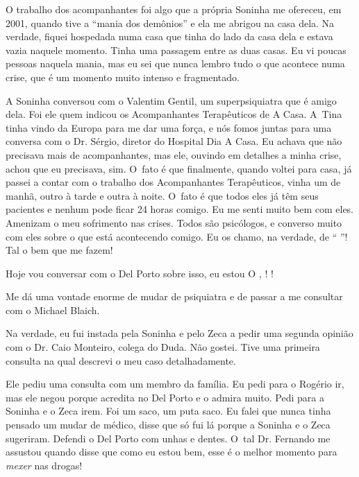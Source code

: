 O trabalho dos acompanhantes foi algo que a própria Soninha me
ofereceu, em 2001, quando tive a ``mania dos demônios'' e ela me abrigou
na casa dela. Na verdade, fiquei hospedada numa casa que tinha do lado
da casa dela e estava vazia naquele momento. Tinha uma passagem entre as
duas casas. Eu vi poucas pessoas naquela mania, mas eu sei que nunca
lembro tudo o que acontece numa crise, que é um momento muito intenso e
fragmentado.

A Soninha conversou com o Valentim Gentil, um superpsiquiatra que é
amigo dela. Foi ele quem indicou os Acompanhantes Terapêuticos de A
Casa. A~Tina tinha vindo da Europa para me dar uma força, e nós fomos
juntas para uma conversa com o Dr. Sérgio, diretor do Hospital Dia A
Casa. Eu achava que não precisava mais de acompanhantes, mas ele,
ouvindo em detalhes a minha crise, achou que eu precisava, sim. O~fato é
que finalmente, quando voltei para casa, já passei a contar com o
trabalho dos Acompanhantes Terapêuticos, vinha um de manhã, outro à
tarde e outra à noite. O~fato é que todos eles já têm seus pacientes e
nenhum pode ficar 24 horas comigo. Eu me senti muito bem com eles.
Amenizam o meu sofrimento nas crises. Todos são psicólogos, e converso
muito com eles sobre o que está acontecendo comigo. Eu os chamo, na
verdade, de `` \emph{}''! Tal o bem que me fazem!

Hoje vou conversar com o Del Porto sobre isso, eu estou    
O  ,    !    !

Me dá uma vontade enorme de mudar de psiquiatra e de passar a me
consultar com o Michael Blaich.

Na verdade, eu fui instada pela Soninha e pelo Zeca a pedir uma segunda
opinião com o Dr. Caio Monteiro, colega do Duda. Não gostei. Tive uma
primeira consulta na qual descrevi o meu caso detalhadamente.

Ele pediu uma consulta com um membro da família. Eu pedi para o Rogério
ir, mas ele negou porque acredita no Del Porto e o admira muito. Pedi
para a Soninha e o Zeca irem. Foi um saco, um puta saco. Eu falei que
nunca tinha pensado um mudar de médico, disse que só fui lá porque a
Soninha e o Zeca sugeriram. Defendi o Del Porto com unhas e dentes. O~tal Dr. Fernando me assustou quando disse que como eu estou bem, esse é
o melhor momento para \emph{mexer} nas drogas!

